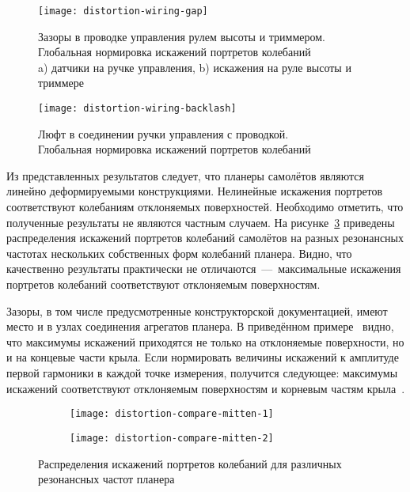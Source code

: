 \begin{figure}[H]
	\centerfloat
	\texttt{[image: distortion-wiring-gap]}
	\caption{Зазоры в проводке управления рулем высоты и триммером. Глобальная нормировка искажений портретов колебаний \\ a) датчики на ручке управления, b) искажения на руле высоты и триммере} \label{fig:distortion-wiring-gap}
\end{figure}

\begin{figure}[!htb]
	\centerfloat
	\texttt{[image: distortion-wiring-backlash]}
	\caption{Люфт в соединении ручки управления с проводкой. \\ Глобальная нормировка искажений портретов колебаний} \label{fig:distortion-wiring-backlash}
\end{figure}

Из представленных результатов следует, что планеры самолётов являются линейно деформируемыми конструкциями. Нелинейные искажения портретов соответствуют колебаниям отклоняемых поверхностей. Необходимо отметить, что полученные результаты не являются частным случаем. На рисунке~\ref{fig:distortion-compare-mitten} приведены распределения искажений портретов колебаний самолётов на разных резонансных частотах нескольких собственных форм колебаний планера. Видно, что качественно результаты практически не отличаются~---~максимальные искажения портретов колебаний соответствуют отклоняемым поверхностям.

Зазоры, в том числе предусмотренные конструкторской документацией, имеют место и в узлах соединения агрегатов планера. В приведённом примере~ видно, что максимумы искажений приходятся не только на отклоняемые поверхности, но и на концевые части крыла. Если нормировать величины искажений к амплитуде первой гармоники в каждой точке измерения, получится следующее: максимумы искажений соответствуют отклоняемым поверхностям и корневым частям крыла~.

\begin{figure}[!htb]
	\centerfloat
	\begin{subfigure}[t]{\sfDefects}
		\texttt{[image: distortion-compare-mitten-1]}
	\end{subfigure}
	\hfill
	\begin{subfigure}[t]{\sfDefects}
		\texttt{[image: distortion-compare-mitten-2]} 
	\end{subfigure}
    \caption{Распределения искажений портретов колебаний для различных резонансных частот планера} \label{fig:distortion-compare-mitten}
\end{figure}

